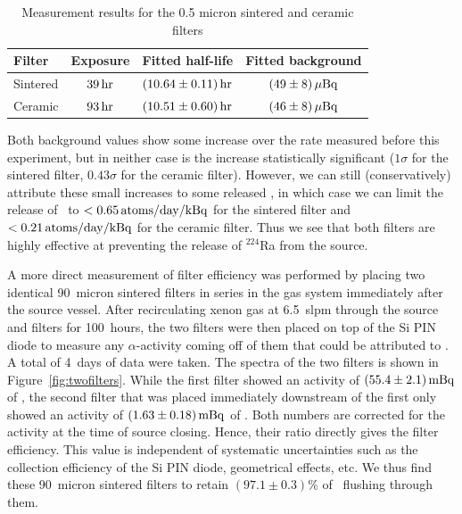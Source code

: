 \begin{table}[htb]
\centering
\caption{Measurement results for the 0.5 micron sintered and ceramic filters}
\label{tab:filter_limits}
\renewcommand{\arraystretch}{1.2}
\begin{tabular}{|lccc|}
\hline\hline
Filter & Exposure & Fitted half-life & Fitted background \\ \hline
Sintered & $39\, \mathrm{hr}$ & $(10.64\pm0.11)\, \mathrm{hr}$ & $(49\pm8)\, \mathrm{\mu Bq}$\\
Ceramic & $93\, \mathrm{hr}$ & $(10.51\pm0.60)\, \mathrm{hr}$ & $(46\pm8)\, \mathrm{\mu Bq}$\\
\hline\hline
\end{tabular}
\end{table}

Both background values show some increase over the rate measured before this experiment, but in neither case is the increase statistically significant ($1\sigma$ for the sintered filter, $0.43\sigma$ for the ceramic filter). However, we can still (conservatively) attribute these small increases to some released \Ra, in which case we can limit the release of \Ra~to $<0.65\, \mathrm{atoms/day/kBq}$ for the sintered filter and $<0.21\, \mathrm{atoms/day/kBq}$ for the ceramic filter. Thus we see that both filters are highly effective at preventing the release of $^{224}$Ra from the source.

A more direct measurement of filter efficiency was performed by placing two identical 90~micron sintered filters in series in the gas system immediately after the source vessel. After recirculating xenon gas at 6.5~slpm through the source and filters for 100~hours, the two filters were then placed on top of the Si PIN diode to measure any $\alpha$-activity coming off of them that could be attributed to \Ra. A total of 4~days of data were taken. The spectra of the two filters is shown in Figure~\ref{fig:twofilters}. While the first filter showed an activity of $(55.4\pm2.1)\, \mathrm{mBq}$ of \Ra, the second filter that was placed immediately downstream of the first only showed an activity of $(1.63\pm0.18)\, \mathrm{mBq}$ of \Ra. Both numbers are corrected for the activity at the time of source closing. Hence, their ratio directly gives the filter efficiency. This value is independent of systematic uncertainties such as the collection efficiency of the Si PIN diode, geometrical effects, etc. We thus find these 90~micron sintered filters to retain $(97.1\pm0.3)$\% of \Ra~flushing through them.

